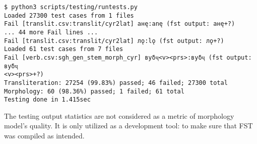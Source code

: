 \begin{code_frame}[float,floatplacement=!htbp]
    \begin{footnotesize}
    \begin{verbatim}
$ python3 scripts/testing/runtests.py
Loaded 27300 test cases from 1 files
Fail [translit.csv:translit/cyr2lat] анę:anę (fst output: анę+?)
... 44 more Fail lines ...
Fail [translit.csv:translit/cyr2lat] лǫ:lǫ (fst output: лǫ+?)
Loaded 61 test cases from 7 files
Fail [verb.csv:sgh_gen_stem_morph_cyr] вуδҷ<v><prs>:вуδҷ (fst output: вуδҷ
<v><prs>+?)
Transliteration: 27254 (99.83%) passed; 46 failed; 27300 total
Morphology: 60 (98.36%) passed; 1 failed; 61 total
Testing done in 1.415sec
    \end{verbatim}
    \end{footnotesize}
    \tcblower
    \label{code:9_2}
\end{code_frame}

The testing output statistics are not considered as a metric of morphology model's quality. It is only utilized as a development tool: to make sure that FST was compiled as intended.